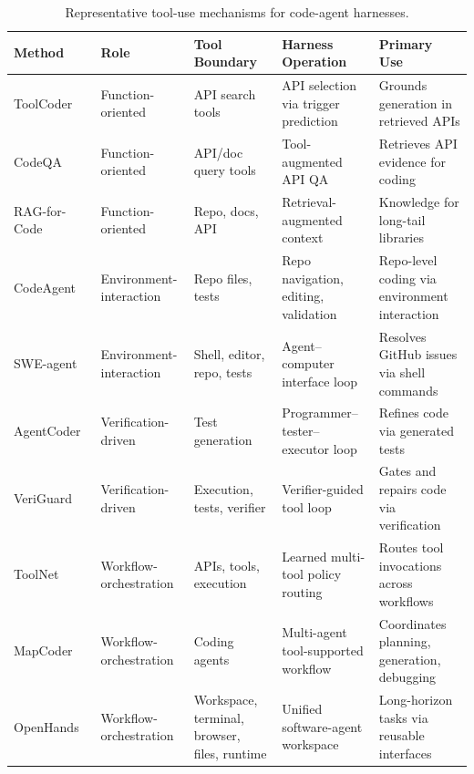 \documentclass{llmxive}
\providecommand{\arraystretch}{1.15}
\begin{document}
\begin{table}[t]
\centering
\renewcommand{\arraystretch}{1.12}
\setlength{\tabcolsep}{3pt}
\scriptsize
\begin{tabularx}{\textwidth}{@{}
  >{\arraybackslash}p{2.6cm}
  >{\arraybackslash}p{3.1cm}
  >{\arraybackslash}p{3.0cm}
  >{\arraybackslash}p{3.8cm}
  >{\arraybackslash}X@{}}
\toprule
\textbf{Method} & \textbf{Role} & \textbf{Tool Boundary} & \textbf{Harness Operation} & \textbf{Primary Use} \\
\midrule
ToolCoder~\cite{zhang2023toolcoder}
& Function-oriented
& API search tools
& API selection via trigger prediction
& Grounds generation in retrieved APIs \\
CodeQA~\cite{ahmed2024codeqa}
& Function-oriented
& API/doc query tools
& Tool-augmented API QA
& Retrieves API evidence for coding \\
RAG-for-Code~\cite{zhao2025rag}
& Function-oriented
& Repo, docs, API
& Retrieval-augmented context
& Knowledge for long-tail libraries \\
\midrule
CodeAgent~\cite{zhang2024codeagent}
& Environment-interaction
& Repo files, tests
& Repo navigation, editing, validation
& Repo-level coding via environment interaction \\
SWE-agent~\cite{yang2024swe}
& Environment-interaction
& Shell, editor, repo, tests
& Agent--computer interface loop
& Resolves GitHub issues via shell commands \\
\midrule
AgentCoder~\cite{huang2023agentcoder}
& Verification-driven
& Test generation
& Programmer--tester--executor loop
& Refines code via generated tests \\
VeriGuard~\cite{miculicich2025veriguard}
& Verification-driven
& Execution, tests, verifier
& Verifier-guided tool loop
& Gates and repairs code via verification \\
\midrule
ToolNet~\cite{liu2024toolnet}
& Workflow-orchestration
& APIs, tools, execution
& Learned multi-tool policy routing
& Routes tool invocations across workflows \\
MapCoder~\cite{islam2024mapcoder}
& Workflow-orchestration
& Coding agents
& Multi-agent tool-supported workflow
& Coordinates planning, generation, debugging \\
OpenHands~\cite{wang2024openhands}
& Workflow-orchestration
& Workspace, terminal, browser, files, runtime
& Unified software-agent workspace
& Long-horizon tasks via reusable interfaces \\
\bottomrule
\end{tabularx}
\caption{Representative tool-use mechanisms for code-agent harnesses.}
\label{tab:tool_modules}
\end{table}
\end{document}
